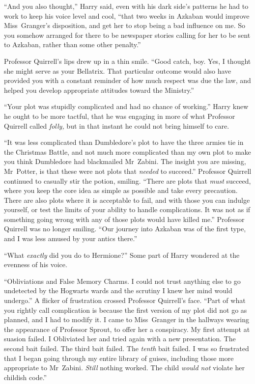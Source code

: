 “And you also thought,” Harry said, even with his dark side’s patterns he had
to work to keep his voice level and cool, “that two weeks in Azkaban would
improve Miss~Granger’s disposition, and get her to stop being a bad influence
on me. So you somehow arranged for there to be newspaper stories calling for
her to be sent to Azkaban, rather than some other penalty.”

Professor Quirrell’s lips drew up in a thin smile. “Good catch, boy. Yes, I
thought she might serve as your Bellatrix. That particular outcome would also
have provided you with a constant reminder of how much respect was due the law,
and helped you develop appropriate attitudes toward the Ministry.”

“Your plot was stupidly complicated and had no chance of working.” Harry knew
he ought to be more tactful, that he was engaging in more of what Professor
Quirrell called \emph{folly,} but in that instant he could not bring himself to
care.

“It was less complicated than Dumbledore’s plot to have the three armies tie in
the Christmas Battle, and not much more complicated than my own plot to make
you think Dumbledore had blackmailed Mr~Zabini. The insight you are missing,
Mr~Potter, is that these were not plots that \emph{needed} to succeed.”
Professor Quirrell continued to casually stir the potion, smiling. “There are
plots that \emph{must} succeed, where you keep the core idea as simple as
possible and take every precaution. There are also plots where it is acceptable
to fail, and with those you can indulge yourself, or test the limits of your
ability to handle complications. It was not as if something going wrong with
any of those plots would have killed me.” Professor Quirrell was no longer
smiling. “Our journey into Azkaban was of the first type, and I was less amused
by your antics there.”

“What \emph{exactly} did you do to Hermione?” Some part of Harry wondered at
the evenness of his voice.

“Obliviations and False Memory Charms. I could not trust anything else to go
undetected by the Hogwarts wards and the scrutiny I knew her mind would
undergo.” A flicker of frustration crossed Professor Quirrell’s face. “Part of
what you rightly call complication is because the first version of my plot did
not go as planned, and I had to modify it. I came to Miss~Granger in the
hallways wearing the appearance of Professor Sprout, to offer her a conspiracy.
My first attempt at suasion failed. I Obliviated her and tried again with a new
presentation. The second bait failed. The third bait failed. The \emph{tenth}
bait failed. I was so frustrated that I began going through my entire library
of guises, including those more appropriate to Mr~Zabini. \emph{Still} nothing
worked. The child \emph{would not} violate her childish code.”

